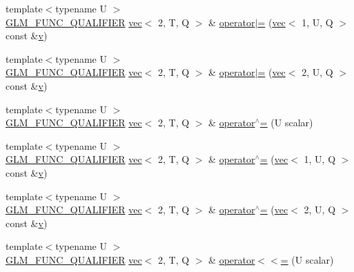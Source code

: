 \begin{DoxyCompactItemize}
\item 
{\footnotesize template$<$typename U $>$ }\\\hyperlink{setup_8hpp_a33fdea6f91c5f834105f7415e2a64407}{G\+L\+M\+\_\+\+F\+U\+N\+C\+\_\+\+Q\+U\+A\+L\+I\+F\+I\+ER} \hyperlink{structglm_1_1vec}{vec}$<$ 2, T, Q $>$ \& \hyperlink{structglm_1_1vec_3_012_00_01_t_00_01_q_01_4_ae4060ed77226e8669a00d6511f61eab3}{operator$\vert$=} (\hyperlink{structglm_1_1vec}{vec}$<$ 1, U, Q $>$ const \&\hyperlink{_s_d_l__opengl_8h_a10a82eabcb59d2fcd74acee063775f90}{v})
\item 
{\footnotesize template$<$typename U $>$ }\\\hyperlink{setup_8hpp_a33fdea6f91c5f834105f7415e2a64407}{G\+L\+M\+\_\+\+F\+U\+N\+C\+\_\+\+Q\+U\+A\+L\+I\+F\+I\+ER} \hyperlink{structglm_1_1vec}{vec}$<$ 2, T, Q $>$ \& \hyperlink{structglm_1_1vec_3_012_00_01_t_00_01_q_01_4_a7c1e10ca06c86243f4ad6ceb094e7bdc}{operator$\vert$=} (\hyperlink{structglm_1_1vec}{vec}$<$ 2, U, Q $>$ const \&\hyperlink{_s_d_l__opengl_8h_a10a82eabcb59d2fcd74acee063775f90}{v})
\item 
{\footnotesize template$<$typename U $>$ }\\\hyperlink{setup_8hpp_a33fdea6f91c5f834105f7415e2a64407}{G\+L\+M\+\_\+\+F\+U\+N\+C\+\_\+\+Q\+U\+A\+L\+I\+F\+I\+ER} \hyperlink{structglm_1_1vec}{vec}$<$ 2, T, Q $>$ \& \hyperlink{structglm_1_1vec_3_012_00_01_t_00_01_q_01_4_a001454ab3038753bcf6550210eee8e59}{operator$^\wedge$=} (U scalar)
\item 
{\footnotesize template$<$typename U $>$ }\\\hyperlink{setup_8hpp_a33fdea6f91c5f834105f7415e2a64407}{G\+L\+M\+\_\+\+F\+U\+N\+C\+\_\+\+Q\+U\+A\+L\+I\+F\+I\+ER} \hyperlink{structglm_1_1vec}{vec}$<$ 2, T, Q $>$ \& \hyperlink{structglm_1_1vec_3_012_00_01_t_00_01_q_01_4_a430b0e95cce94009cb9822a7b8a08f89}{operator$^\wedge$=} (\hyperlink{structglm_1_1vec}{vec}$<$ 1, U, Q $>$ const \&\hyperlink{_s_d_l__opengl_8h_a10a82eabcb59d2fcd74acee063775f90}{v})
\item 
{\footnotesize template$<$typename U $>$ }\\\hyperlink{setup_8hpp_a33fdea6f91c5f834105f7415e2a64407}{G\+L\+M\+\_\+\+F\+U\+N\+C\+\_\+\+Q\+U\+A\+L\+I\+F\+I\+ER} \hyperlink{structglm_1_1vec}{vec}$<$ 2, T, Q $>$ \& \hyperlink{structglm_1_1vec_3_012_00_01_t_00_01_q_01_4_afed5270119c717c84024b98edb08e265}{operator$^\wedge$=} (\hyperlink{structglm_1_1vec}{vec}$<$ 2, U, Q $>$ const \&\hyperlink{_s_d_l__opengl_8h_a10a82eabcb59d2fcd74acee063775f90}{v})
\item 
{\footnotesize template$<$typename U $>$ }\\\hyperlink{setup_8hpp_a33fdea6f91c5f834105f7415e2a64407}{G\+L\+M\+\_\+\+F\+U\+N\+C\+\_\+\+Q\+U\+A\+L\+I\+F\+I\+ER} \hyperlink{structglm_1_1vec}{vec}$<$ 2, T, Q $>$ \& \hyperlink{structglm_1_1vec_3_012_00_01_t_00_01_q_01_4_ace47fc51a0a40c12d24193c4ff6ac8ae}{operator$<$$<$=} (U scalar)

\end{DoxyCompactItemize}
